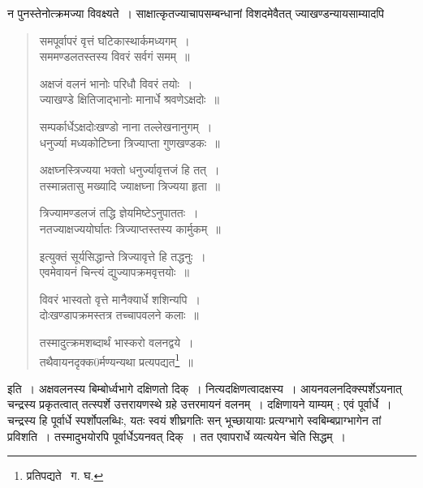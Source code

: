 \documentclass[11pt, openany]{book}
\begin{document}
\newpage

\noindent न पुनस्तेनोत्क्रमज्या विवक्ष्यते~। साक्षात्कृतज्याचापसम्बन्धानां विशदमेवैतत् ज्याखण्डन्यायसाम्यादपि\textendash  
\begin{quote}
{\qt समपूर्वापरं वृत्तं घटिकास्थार्कमध्यगम्~।\\
सममण्डलतस्तस्य विवरं सर्वगं समम्~॥

अक्षजं वलनं भानोः परिधौ विवरं तयोः~।\\
ज्याखण्डे क्षितिजाद्भानोः मानार्धे श्रवणेऽक्षदोः~॥

सम्पर्कार्धेऽक्षदोःखण्डो नाना तल्लेखनानुगम्~।\\
धनुर्ज्या मध्यकोटिघ्ना त्रिज्याप्ता गुणखण्डकः~॥

अक्षघ्नस्त्रिज्यया भक्तो धनुर्ज्यावृत्तजं हि तत्~।\\
तस्मान्नतासु मख्यादि ज्याक्षघ्ना त्रिज्यया हृता~॥

त्रिज्यामण्डलजं तद्धि ज्ञेयमिष्टेऽनुपाततः~।\\
नतज्याक्षज्ययोर्घातः त्रिज्याप्तस्तस्य कार्मुकम्~॥

इत्युक्तं सूर्यसिद्धान्ते त्रिज्यावृत्ते हि तद्धनुः~।\\
एवमेवायनं चिन्त्यं द्युज्यापक्रमवृत्तयोः~॥

विवरं भास्वतो वृत्ते मानैक्यार्धे शशिन्यपि~।\\
दोःखण्डापक्रमस्तत्र तच्चापवलने कलाः~॥

तस्मादुत्क्रमशब्दार्थं भास्करो वलनद्वये~।\\
तथैवायनदृक्क0र्मण्यन्यथा प्रत्यपद्यत\renewcommand{\thefootnote}{१}\footnote{प्रतिपद्यते \textendash\ ग. घ.}~॥}
\end{quote}

\noindent इति~। अक्षवलनस्य बिम्बोर्ध्वभागे दक्षिणतो दिक्~। नित्यदक्षिणत्वादक्षस्य~। आयनवलनदिक्स्पर्शेऽयनात् चन्द्रस्य प्रकृतत्वात् तत्स्पर्शे उत्तरायणस्थे ग्रहे उत्तरमायनं वलनम्~। दक्षिणायने याम्यम् ; एवं पूर्वार्धे~। चन्द्रस्य हि पूर्वार्धे स्पर्शोपलब्धिः, यतः स्वयं शीघ्रगतिः
सन् भूच्छायायाः प्रत्यग्भागे स्वबिम्बप्राग्भागेन तां प्रविशति~। तस्मादुभयोरपि पूर्वार्धेऽयनवत् दिक्~। तत एवापरार्धे व्यत्ययेन चेति सिद्धम्~। 

\newpage
\end{document}
